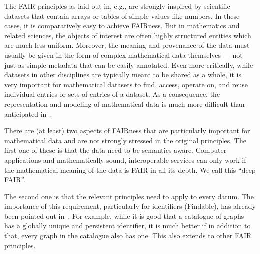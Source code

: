 The FAIR principles as laid out in, e.g., \cite{WilDumAal:FAIR16} are strongly inspired by scientific datasets that contain arrays or tables of simple values like numbers.
In these cases, it is comparatively easy to achieve FAIRness.
But in mathematics and related sciences, the objects of interest are often highly structured entities which are much less uniform.
Moreover, the meaning and provenance of the data must usually be given in the form of complex mathematical data themselves --- not just as simple metadata that can be easily annotated.
Even more critically, while datasets in other disciplines are typically meant to be shared as a whole, it is very important for mathematical datasets to find, access, operate on, and reuse individual entries or sets of entries of a dataset.
As a consequence, the representation and modeling of mathematical data is much more difficult than anticipated in~\cite{WilDumAal:FAIR16}.

There are (at least) two aspects of FAIRness that are particularly important for mathematical data and 
are not strongly stressed in the original principles.
The first one of these is that the data need to be semantics aware.
Computer applications and mathematically sound, interoperable services
can only work if the mathematical meaning of the data is FAIR in all its depth.
We call this ``deep FAIR''.


The second one is that the relevant principles need to apply to every datum.
The importance of this requirement, particularly for identifiers (Findable),
has already been pointed out in~\cite{BilTen:fingerprint13}.
For example, while it is good that a catalogue of graphs has a globally unique and persistent identifier,
it is much better if in addition to that, every graph in the catalogue also has one.
This also extends to other FAIR principles.




